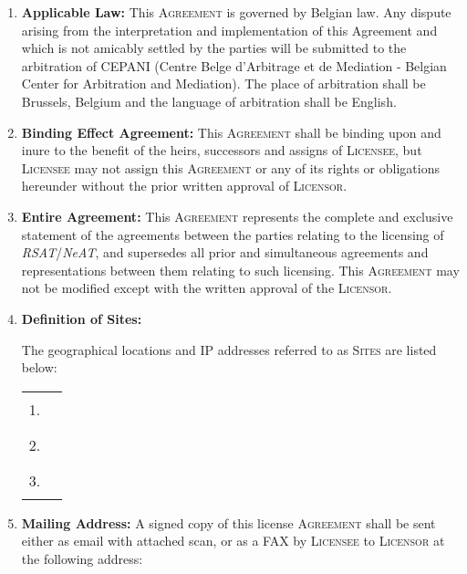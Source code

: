 \documentclass[12pt]{article}
\newcommand{\RSAT}[0]{\emph{RSAT}\xspace}
\newcommand{\NeAT}[0]{\emph{NeAT}\xspace}
\newcommand{\Licensor}[0]{\textsc{Licensor}\xspace}
\newcommand{\Licensee}[0]{\textsc{Licensee}\xspace}
\newcommand{\Agreement}[0]{\textsc{Agreement}\xspace}
\newcommand{\Sites}[0]{\textsc{Sites}\xspace}
\newcommand{\Fillline}[0]{\rule{10cm}{1pt}}
\newcommand{\Paragraph}[2]{\item \textbf{#1:} #2}
\begin{document}
\begin{enumerate}
{%
}

\Paragraph{Applicable Law}{This \Agreement is governed by Belgian law. Any
dispute arising from the interpretation and implementation of this
Agreement and which is not amicably settled by the parties will be
submitted to the arbitration of CEPANI (Centre Belge d'Arbitrage et de
Mediation - Belgian Center for Arbitration and Mediation). The place
of arbitration shall be Brussels, Belgium and the language of
arbitration shall be English.

}

\Paragraph{Binding Effect Agreement}{This \Agreement shall be binding 
upon and inure to the benefit of the heirs, successors and assigns of 
\Licensee, but \Licensee may not assign this \Agreement or any of its 
rights or obligations hereunder without the prior written approval of 
\Licensor.
}

\Paragraph{Entire Agreement}{This \Agreement represents the complete 
and exclusive statement of the agreements between the parties 
relating to the licensing of \RSAT/\NeAT, and supersedes all 
prior and simultaneous agreements and representations between them 
relating to such licensing. This \Agreement may not be modified except 
with the written approval of the \Licensor.
}

\Paragraph{Definition of Sites}{

The geographical locations and IP addresses referred to as \Sites are listed below:

\begin{center}
\begin{tabular}{lp{14cm}}
1.&\Fillline\\[5mm]
2.&\Fillline\\[5mm]
3.&\Fillline
\end{tabular}
\end{center}
}
\label{DefSites}


\Paragraph{Mailing Address}{A signed copy of this license \Agreement
  shall be sent either as email with attached scan, or as a FAX by \Licensee to
  \Licensor at the following address:

}
\end{enumerate}
\end{document}
